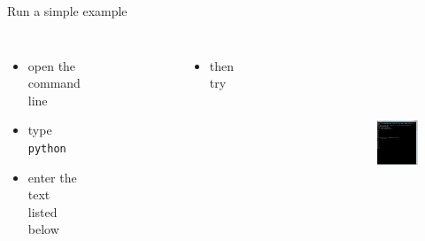 \documentclass[t]{beamer}
\begin{document}
\begin{frame}{Run a simple example}
	\begin{columns}
			\begin{itemize}
				\item open the command line
				\item type \texttt{python}
				\item enter the text listed below
			\end{itemize}
			\vspace{-15pt}\begin{figure}[ht]
  				\centering
	        		
 			\end{figure}
			\vspace{-15pt}\begin{itemize}
				\item then try
			\end{itemize}
			\vspace{-15pt}\begin{figure}[ht]
  				\centering
	        		
 			\end{figure}
			\vspace{-15pt}\begin{figure}[ht]
				\centering
        			\includegraphics[height=0.95\textwidth]{figures/ProcessFlowInClass.png}
			\end{figure}
	\end{columns}
\end{frame}
\end{document}
